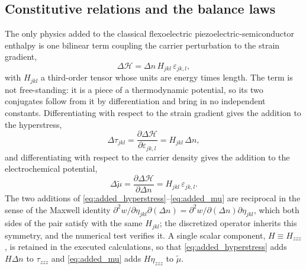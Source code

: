 \subsection{Constitutive relations and the balance laws}
\label{sec:governing_constitutive}
\label{sec:governing_balance}

The only physics added to the classical flexoelectric piezoelectric-semiconductor
enthalpy is one bilinear term coupling the carrier perturbation to the strain
gradient,
\begin{equation}
\label{eq:added_coupling}
\Delta\mathcal{H}=\Delta n\,H_{jkl}\,\varepsilon_{jk,l},
\end{equation}
with $H_{jkl}$ a third-order tensor whose units are energy times length.  The
term is not free-standing: it is a piece of a thermodynamic potential, so its two
conjugates follow from it by differentiation and bring in no independent constants.
Differentiating with respect to the strain gradient gives the addition to the
hyperstress,
\begin{equation}
\label{eq:added_hyperstress}
\Delta\tau_{jkl}=\frac{\partial\Delta\mathcal{H}}{\partial\varepsilon_{jk,l}}
=H_{jkl}\,\Delta n ,
\end{equation}
and differentiating with respect to the carrier density gives the addition to the
electrochemical potential,
\begin{equation}
\label{eq:added_mu}
\Delta\widetilde\mu=\frac{\partial\Delta\mathcal{H}}{\partial\Delta n}
=H_{jkl}\,\varepsilon_{jk,l} .
\end{equation}
The two additions of \eqref{eq:added_hyperstress}--\eqref{eq:added_mu} are
reciprocal in the sense of the Maxwell identity
$\partial^{2}w/\partial\eta_{jkl}\partial(\Delta n)
=\partial^{2}w/\partial(\Delta n)\partial\eta_{jkl}$, which both sides of the
pair satisfy with the same $H_{jkl}$; the discretized operator inherits this symmetry, and the numerical test verifies it.  A single scalar component,
$H\equiv H_{zzz}$, is retained in the executed calculations, so that
\eqref{eq:added_hyperstress} adds $H\Delta n$ to $\tau_{zzz}$ and
\eqref{eq:added_mu} adds $H\eta_{zzz}$ to $\widetilde\mu$.

